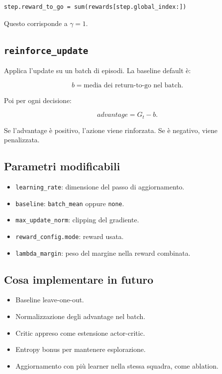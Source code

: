 \documentclass[11pt,a4paper]{article}
\begin{document}
\begin{verbatim}
step.reward_to_go = sum(rewards[step.global_index:])
\end{verbatim}

Questo corrisponde a \(\gamma=1\).

\subsection{\texttt{reinforce\_update}}

Applica l'update su un batch di episodi. La baseline default è:

\[
b = \text{media dei return-to-go nel batch}.
\]

Poi per ogni decisione:

\[
advantage = G_t-b.
\]

Se l'advantage è positivo, l'azione viene rinforzata. Se è negativo, viene
penalizzata.

\subsection{Parametri modificabili}

\begin{itemize}
  \item \texttt{learning\_rate}: dimensione del passo di aggiornamento.
  \item \texttt{baseline}: \texttt{batch\_mean} oppure \texttt{none}.
  \item \texttt{max\_update\_norm}: clipping del gradiente.
  \item \texttt{reward\_config.mode}: reward usata.
  \item \texttt{lambda\_margin}: peso del margine nella reward combinata.
\end{itemize}

\subsection{Cosa implementare in futuro}

\begin{itemize}
  \item Baseline leave-one-out.
  \item Normalizzazione degli advantage nel batch.
  \item Critic appreso come estensione actor-critic.
  \item Entropy bonus per mantenere esplorazione.
  \item Aggiornamento con più learner nella stessa squadra, come ablation.
\end{itemize}
\end{document}
